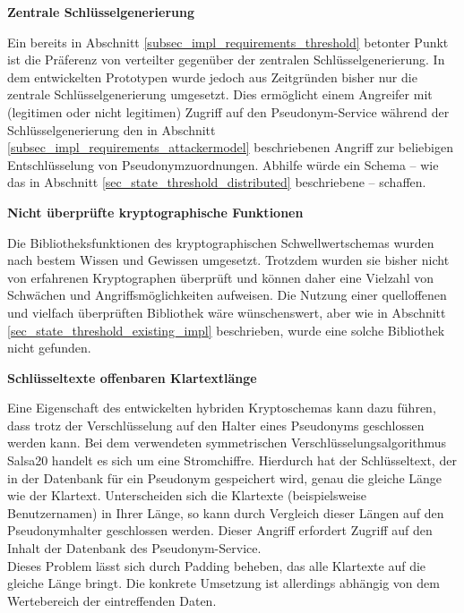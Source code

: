 
\textbf{Zentrale Schlüsselgenerierung}

Ein bereits in Abschnitt \ref{subsec_impl_requirements_threshold} betonter Punkt ist die Präferenz von verteilter gegenüber der zentralen Schlüsselgenerierung. In dem entwickelten Prototypen wurde jedoch aus Zeitgründen bisher nur die zentrale Schlüsselgenerierung umgesetzt. Dies ermöglicht einem Angreifer mit (legitimen oder nicht legitimen) Zugriff auf den Pseudonym-Service während der Schlüsselgenerierung den in Abschnitt \ref{subsec_impl_requirements_attackermodel} beschriebenen Angriff zur beliebigen Entschlüsselung von Pseudonymzuordnungen. Abhilfe würde ein Schema -- wie das in Abschnitt \ref{sec_state_threshold_distributed} beschriebene -- schaffen.


\textbf{Nicht überprüfte kryptographische Funktionen}

Die Bibliotheksfunktionen des kryptographischen Schwellwertschemas wurden nach bestem Wissen und Gewissen umgesetzt. Trotzdem wurden sie bisher nicht von erfahrenen Kryptographen überprüft und können daher eine Vielzahl von Schwächen und Angriffsmöglichkeiten aufweisen. Die Nutzung einer quelloffenen und vielfach überprüften Bibliothek wäre wünschenswert, aber wie in Abschnitt \ref{sec_state_threshold_existing_impl} beschrieben, wurde eine solche Bibliothek nicht gefunden.


\textbf{Schlüsseltexte offenbaren Klartextlänge}

Eine Eigenschaft des entwickelten hybriden Kryptoschemas kann dazu führen, dass trotz der Verschlüsselung auf den Halter eines Pseudonyms geschlossen werden kann. Bei dem verwendeten symmetrischen Verschlüsselungsalgorithmus Salsa20 handelt es sich um eine Stromchiffre. Hierdurch hat der Schlüsseltext, der in der Datenbank für ein Pseudonym gespeichert wird, genau die gleiche Länge wie der Klartext. Unterscheiden sich die Klartexte (beispielsweise Benutzernamen) in Ihrer Länge, so kann durch Vergleich dieser Längen auf den Pseudonymhalter geschlossen werden.  Dieser Angriff erfordert Zugriff auf den Inhalt der Datenbank des Pseudonym-Service.\\
Dieses Problem lässt sich durch Padding beheben, das alle Klartexte auf die gleiche Länge bringt. Die konkrete Umsetzung ist allerdings abhängig von dem Wertebereich der eintreffenden Daten.

